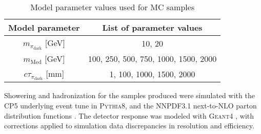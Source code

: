 \begin{table}[]
    \centering
    \begin{tabular}{|c|c|}
        \hline
        Model parameter & List of parameter values \\
        \hline
        $m_{\pi_{\text{dark}}}$ [GeV]   &   10, 20 \\
        $m_{\text{Med}}$ [GeV]          & 100, 250, 500, 750, 1000, 1500, 2000 \\
        $c\tau_{\pi_{\text{dark}}}$ [mm]& 1, 100, 1000, 1500, 2000\\
        \hline
    \end{tabular}
    \caption{Model parameter values used for MC samples}
    \label{tab:param_vals}
\end{table}

Showering and hadronization for the samples produced were simulated with the CP5 underlying event tune \cite{sirunyanExtractionValidationNew2020} in \textsc{Pythia8}, and the NNPDF3.1 next-to-NLO parton distribution functions \cite{ballPartonDistributionsHighprecision2017}. The detector response was modeled with \textsc{Geant4} \cite{agostinelliGeant4aSimulationToolkit2003}, with corrections applied to simulation data discrepancies in resolution and efficiency.